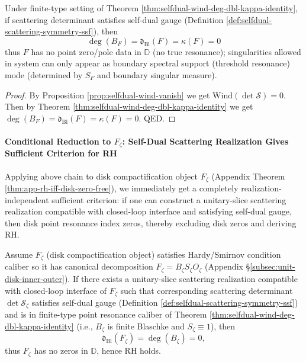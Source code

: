 \begin{corollary}\label{cor:selfdual-implies-kappa0}
Under finite-type setting of Theorem \ref{thm:selfdual-wind-deg-dbl-kappa-identity}, if scattering determinant satisfies self-dual gauge (Definition \ref{def:selfdual-scattering-symmetry-ssf}), then
\[
\boxed{\;
\deg(B_F)=\mathfrak d_{\mathrm{Bl}}(F)=\kappa(F)=0\;}
\]
thus \(F\) has no point zero/pole data in \(\mathbb{D}\) (no true resonance); singularities allowed in system can only appear as boundary spectral support (threshold resonance) mode (determined by \(S_F\) and boundary singular measure).
\end{corollary}

\begin{proof}
By Proposition \ref{prop:selfdual-wind-vanish} we get \(\mathrm{Wind}(\det\mathcal S)=0\).
Then by Theorem \ref{thm:selfdual-wind-deg-dbl-kappa-identity} we get \(\deg(B_F)=\mathfrak d_{\mathrm{Bl}}(F)=\kappa(F)=0\). QED.
\end{proof}

\paragraph{Conditional Reduction to \texorpdfstring{$F_{\zeta}$}{Fzeta}: Self-Dual Scattering Realization Gives Sufficient Criterion for RH}
Applying above chain to disk compactification object \(F_{\zeta}\) (Appendix Theorem \ref{thm:app-rh-iff-disk-zero-free}), we immediately get a completely realization-independent sufficient criterion: if one can construct a unitary-slice scattering realization compatible with closed-loop interface and satisfying self-dual gauge, then disk point resonance index zeros, thereby excluding disk zeros and deriving RH.

\begin{theorem}\label{thm:xi-selfdual-scattering-sufficient-rh}
Assume \(F_{\zeta}\) (disk compactification object) satisfies Hardy/Smirnov condition caliber so it has canonical decomposition \(F_{\zeta}=B_{\zeta}S_{\zeta}O_{\zeta}\) (Appendix \S\ref{subsec:unit-disk-inner-outer}).
If there exists a unitary-slice scattering realization compatible with closed-loop interface of \(F_{\zeta}\) such that corresponding scattering determinant \(\det\mathcal S_{\zeta}\) satisfies self-dual gauge (Definition \ref{def:selfdual-scattering-symmetry-ssf}) and is in finite-type point resonance caliber of Theorem \ref{thm:selfdual-wind-deg-dbl-kappa-identity} (i.e., \(B_{\zeta}\) is finite Blaschke and \(S_{\zeta}\equiv 1\)), then
\[
\mathfrak d_{\mathrm{Bl}}(F_{\zeta})=\deg(B_{\zeta})=0,
\]
thus \(F_{\zeta}\) has no zeros in \(\mathbb{D}\), hence RH holds.
\end{theorem}

